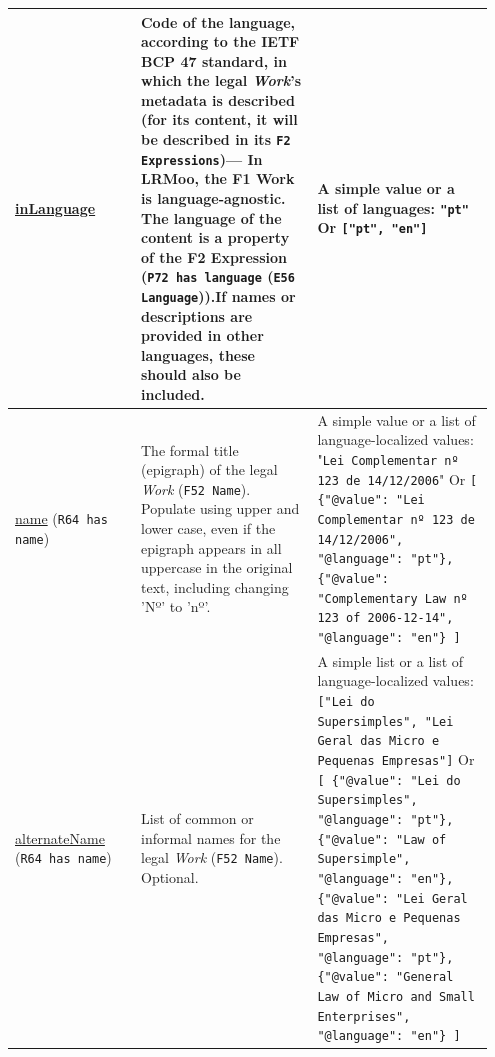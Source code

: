 \documentclass[11pt]{article}
\begin{document}
\begin{longtable}{p{0.25\linewidth} p{0.35\linewidth} p{0.35\linewidth}}
\url{inLanguage} & Code of the language, according to the IETF BCP 47 standard, in which the legal \emph{Work}'s metadata is described (for its content, it will be described in its \texttt{F2 Expressions})--- In LRMoo, the F1 Work is language-agnostic. The language of the content is a property of the F2 Expression (\texttt{P72 has language} (\texttt{E56 Language})).\newline If names or descriptions are provided in other languages, these should also be included. & A simple value or a list of languages: \newline \texttt{"pt"} \newline Or \newline \texttt{["pt", "en"]} \\
\midrule

\url{name} \newline (\texttt{R64 has name}) & The formal title (epigraph) of the legal \emph{Work} (\texttt{F52 Name}). \newline Populate using upper and lower case, even if the epigraph appears in all uppercase in the original text, including changing 'Nº' to 'nº'. & A simple value or a list of language-localized values: \newline "\texttt{Lei Complementar nº 123 de 14/12/2006}" \newline Or \newline \texttt{[ \newline \{"@value": "Lei Complementar nº 123 de 14/12/2006", \newline "@language": "pt"\}, \newline \{"@value": "Complementary Law nº 123 of 2006-12-14", \newline "@language": "en"\} \newline]} \\
\midrule

\url{alternateName} \newline (\texttt{R64 has name}) & List of common or informal names for the legal \emph{Work} (\texttt{F52 Name}). Optional. & A simple list or a list of language-localized values: \newline \texttt{["Lei do Supersimples", "Lei Geral das Micro e Pequenas Empresas"]} \newline Or \newline \texttt{[ \newline \{"@value": "Lei do Supersimples", \newline "@language": "pt"\}, \newline \{"@value": "Law of Supersimple", \newline "@language": "en"\}, \newline \{"@value": "Lei Geral das Micro e Pequenas Empresas", \newline "@language": "pt"\}, \newline \{"@value": "General Law of Micro and Small Enterprises", \newline "@language": "en"\} \newline ]} \\
\midrule


\end{longtable}
\end{document}
